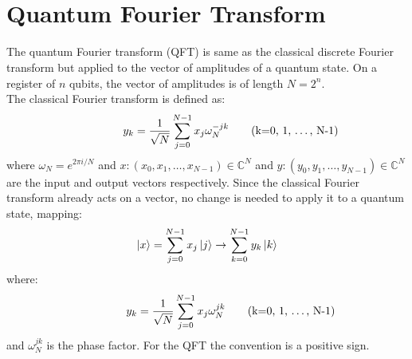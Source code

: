 \documentclass[reqno]{amsart}
\numberwithin{equation}{section}
\numberwithin{figure}{section}
\begin{document}
\section{\\Quantum Fourier Transform} \label{sec:QFT}
\begin{justify}
    The quantum Fourier transform (QFT) is same as the classical discrete Fourier transform but applied to the vector of amplitudes of a quantum state. On a register of $n$ qubits, the vector of amplitudes is of length $N = 2^{n}$.\\

    The classical Fourier transform is defined as:
    \begin{equation}
        \hspace*{1.5cm}
        y_{k} = \frac{1}{\sqrt{N}}\sum\limits_{j=0}^{N-1}x_{j}\omega_{N}^{-jk} \tag{k=0, 1, \ldots, N-1}
    \end{equation}
    where $\omega_{N} = e^{2\pi i/N}$ and $x: (x_{0}, x_{1}, \ldots, x_{N-1}) \in \mathbb{C}^{N}$ and $y: (y_{0}, y_{1}, \ldots, y_{N-1}) \in \mathbb{C}^{N}$ are the input and output vectors respectively. Since the classical Fourier transform already acts on a vector, no change is needed to apply it to a quantum state, mapping:
    \begin{equation}
        \ket{x} = \sum\limits_{j=0}^{N-1}x_{j}\ket{j} \rightarrow \sum\limits_{k=0}^{N-1}y_{k}\ket{k}
    \end{equation}
    where:
    \begin{equation}
        \hspace*{1.5cm}
        y_{k} = \frac{1}{\sqrt{N}}\sum\limits_{j=0}^{N-1}x_{j}\omega_{N}^{jk} \tag{k=0, 1, \ldots, N-1}
    \end{equation}
    and $\omega_{N}^{jk}$ is the phase factor. For the QFT the convention is a positive sign. \\


\end{justify}
\end{document}
